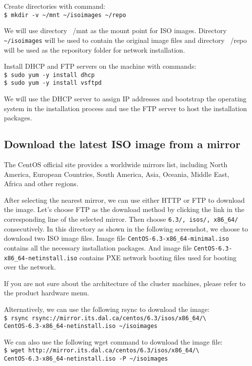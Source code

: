 Create directories with command: \\
\verb|$ mkdir -v ~/mnt ~/isoimages ~/repo|

We will use directory ~/mnt as the mount point for ISO images. Directory \verb|~/isoimages| will be used to contain the original image files and directory ~/repo will be used as the repository folder for network installation.

Install DHCP and FTP servers on the machine with commands: \\
\verb|$ sudo yum -y install dhcp| \\
\verb|$ sudo yum -y install vsftpd|

We will use the DHCP server to assign IP addresses and bootstrap the operating system in the installation process and use the FTP server to host the installation packages.
\subsection*{Download the latest ISO image from a mirror}
The CentOS official site provides a worldwide mirrors list, including North America, European Countries, South America, Asia, Oceania, Middle East, Africa and other regions.

After selecting the nearest mirror, we can use either HTTP or FTP to download the image. Let's choose FTP as the download method by clicking the link in the corresponding line of the selected mirror. Then choose \verb|6.3/, isos/, x86_64/| consecutively. In this directory as shown in the following screenshot, we choose to download two ISO image files. Image file \verb|CentOS-6.3-x86_64-minimal.iso| contains all the necessary installation packages. And image file \verb|CentOS-6.3-x86_64-netinstall.iso| contains PXE network booting files used for booting over the network.

If you are not sure about the architecture of the cluster machines, please refer to the product hardware menu.

Alternatively, we can use the following rsync to download the image: \\
\verb|$ rsync rsync://mirror.its.dal.ca/centos/6.3/isos/x86_64/\| \\
\verb|CentOS-6.3-x86_64-netinstall.iso ~/isoimages|

We can also use the following wget command to download the image file: \\
\verb|$ wget http://mirror.its.dal.ca/centos/6.3/isos/x86_64/\| \\
\verb|CentOS-6.3-x86_64-netinstall.iso -P ~/isoimages|

